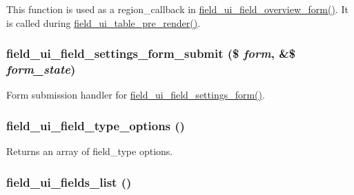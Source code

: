 This function is used as a region\_\-callback in \hyperlink{group__forms_gad62638f853fe251696eb3b57e8111845}{field\_\-ui\_\-field\_\-overview\_\-form()}. It is called during \hyperlink{field__ui_8admin_8inc_a3aaaf5a32e48e5cebdae7abb960fb0fc}{field\_\-ui\_\-table\_\-pre\_\-render()}. \hypertarget{field__ui_8admin_8inc_a6fe96f11dbf7f63b4723c77abe423654}{
\subsubsection[{field\_\-ui\_\-field\_\-settings\_\-form\_\-submit}]{\setlength{\rightskip}{0pt plus 5cm}field\_\-ui\_\-field\_\-settings\_\-form\_\-submit (\$ {\em form}, \/  \&\$ {\em form\_\-state})}}
\label{field__ui_8admin_8inc_a6fe96f11dbf7f63b4723c77abe423654}
Form submission handler for \hyperlink{group__forms_gaf347f488d97997991b92aae7060a10f2}{field\_\-ui\_\-field\_\-settings\_\-form()}. \hypertarget{field__ui_8admin_8inc_afc9556060992445e85040f87255db971}{
\subsubsection[{field\_\-ui\_\-field\_\-type\_\-options}]{\setlength{\rightskip}{0pt plus 5cm}field\_\-ui\_\-field\_\-type\_\-options ()}}
\label{field__ui_8admin_8inc_afc9556060992445e85040f87255db971}
Returns an array of field\_\-type options. \hypertarget{field__ui_8admin_8inc_a5e0e40fc338f93f08e74a304bada0df6}{
\subsubsection[{field\_\-ui\_\-fields\_\-list}]{\setlength{\rightskip}{0pt plus 5cm}field\_\-ui\_\-fields\_\-list ()}}
\label{field__ui_8admin_8inc_a5e0e40fc338f93f08e74a304bada0df6}
